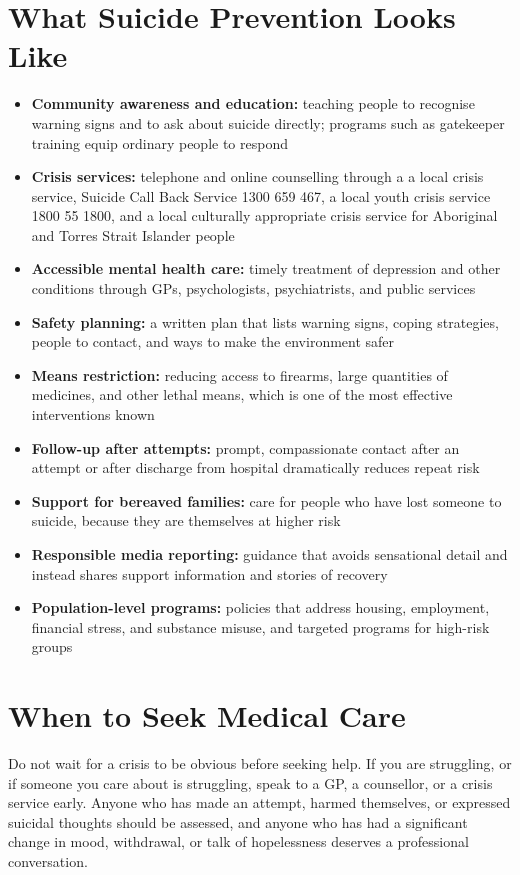 \section*{What Suicide Prevention Looks Like}
\begin{itemize}
    \item \textbf{Community awareness and education:} teaching people to recognise warning signs and to ask about suicide directly; programs such as gatekeeper training equip ordinary people to respond
    \item \textbf{Crisis services:} telephone and online counselling through a a local crisis service, Suicide Call Back Service 1300 659 467, a local youth crisis service 1800 55 1800, and a local culturally appropriate crisis service for Aboriginal and Torres Strait Islander people
    \item \textbf{Accessible mental health care:} timely treatment of depression and other conditions through GPs, psychologists, psychiatrists, and public services
    \item \textbf{Safety planning:} a written plan that lists warning signs, coping strategies, people to contact, and ways to make the environment safer
    \item \textbf{Means restriction:} reducing access to firearms, large quantities of medicines, and other lethal means, which is one of the most effective interventions known
    \item \textbf{Follow-up after attempts:} prompt, compassionate contact after an attempt or after discharge from hospital dramatically reduces repeat risk
    \item \textbf{Support for bereaved families:} care for people who have lost someone to suicide, because they are themselves at higher risk
    \item \textbf{Responsible media reporting:} guidance that avoids sensational detail and instead shares support information and stories of recovery
    \item \textbf{Population-level programs:} policies that address housing, employment, financial stress, and substance misuse, and targeted programs for high-risk groups
\end{itemize}

\section*{When to Seek Medical Care}
Do not wait for a crisis to be obvious before seeking help. If you are struggling, or if someone you care about is struggling, speak to a GP, a counsellor, or a crisis service early. Anyone who has made an attempt, harmed themselves, or expressed suicidal thoughts should be assessed, and anyone who has had a significant change in mood, withdrawal, or talk of hopelessness deserves a professional conversation.

